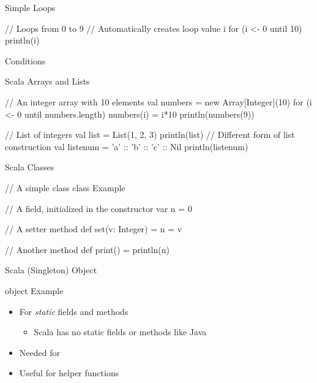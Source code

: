 \begin{frame}[fragile]{Simple Loops}
\begin{chisel}
// Loops from 0 to 9
// Automatically creates loop value i
for (i <- 0 until 10) {
  println(i)
}
\end{chisel}
\end{frame}

\begin{frame}[fragile]{Conditions}
\end{frame}

\begin{frame}[fragile]{Scala Arrays and Lists}
\begin{chisel}
// An integer array with 10 elements
val numbers = new Array[Integer](10)
for (i <- 0 until numbers.length) {
  numbers(i) = i*10
}
println(numbers(9))


// List of integers
val list = List(1, 2, 3)
println(list)
// Different form of list construction
val listenum = 'a' :: 'b' :: 'c' :: Nil
println(listenum)
\end{chisel}
\end{frame}


\begin{frame}[fragile]{Scala Classes}
\begin{chisel}
// A simple class
class Example {
  // A field, initialized in the constructor
  var n = 0
  
  // A setter method
  def set(v: Integer) = {
    n = v
  }
  
  // Another method
  def print() = {
    println(n)
  }
}
\end{chisel}
\end{frame}

\begin{frame}[fragile]{Scala (Singleton) Object}
\begin{chisel}
object Example {}
\end{chisel}
\begin{itemize}
\item For \emph{static} fields and methods
\begin{itemize}
\item Scala has no static fields or methods like Java
\end{itemize}
\item Needed for 
\item Useful for helper functions
\end{itemize}
\end{frame}

